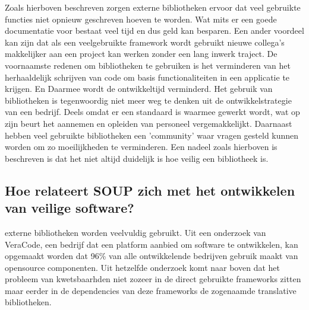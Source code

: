 Zoals hierboven beschreven zorgen externe bibliotheken ervoor dat veel gebruikte functies niet opnieuw geschreven hoeven te worden. Wat mits er een goede documentatie voor bestaat veel tijd en dus geld kan besparen. Een ander voordeel kan zijn dat als een veelgebruikte framework wordt gebruikt nieuwe collega's makkelijker aan een project kan werken zonder een lang inwerk traject.
De voornaamste redenen om bibliotheken te gebruiken is het verminderen van het herhaaldelijk schrijven van code om basis functionaliteiten in een applicatie te krijgen. En Daarmee wordt de ontwikkeltijd verminderd. Het gebruik van bibliotheken is tegenwoordig niet meer weg te denken uit de ontwikkelstrategie van een bedrijf. Deels omdat er een standaard is waarmee gewerkt wordt, wat op zijn beurt het aannemen en opleiden van personeel vergemakkelijkt. Daarnaast hebben veel gebruikte bibliotheken een 'community' waar vragen gesteld kunnen worden om zo moeilijkheden te verminderen. Een nadeel zoals hierboven is beschreven is dat het niet altijd duidelijk is hoe veilig een bibliotheek is.


\subsection{Hoe relateert SOUP zich met het ontwikkelen van veilige software?}\label{subsec:hoe-relateert-soup-zich-met-het-ontwikkelen-van-veilige-software?}
externe bibliotheken worden veelvuldig gebruikt. Uit een onderzoek van VeraCode, een bedrijf dat een platform aanbied om software te ontwikkelen, kan opgemaakt worden dat 96\% van alle ontwikkelende bedrijven gebruik maakt van opensource componenten. Uit hetzelfde onderzoek komt naar boven dat het probleem van kwetsbaarhden niet zozeer in de direct gebruikte frameworks zitten maar eerder in de dependencies van deze frameworks de zogenaamde translative bibliotheken.


